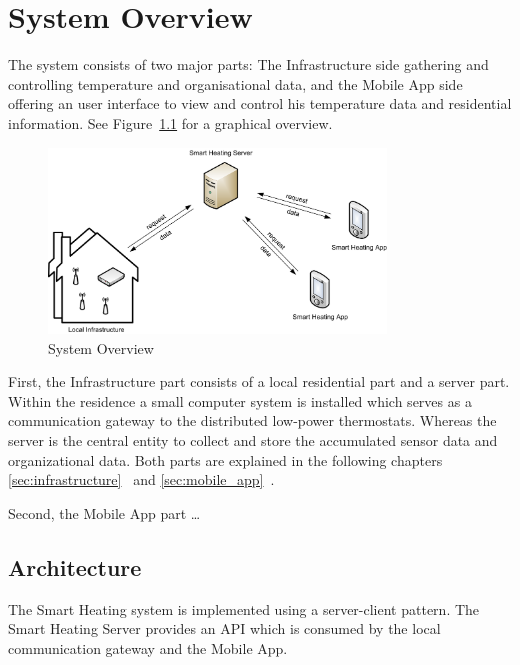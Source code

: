
\chapter{System Overview}
\label{sec:system_overview}

The system consists of two major parts: The Infrastructure side gathering and controlling temperature and organisational data, and the Mobile App side offering an user interface to view and control his temperature data and residential information. See Figure~\ref{fig:systemoverview} for a graphical overview.

\begin{figure}[h]
\begin{center}
\includegraphics[width=0.8\textwidth]{images/SystemOverview.png}
\end{center}
\caption{System Overview}
\label{fig:systemoverview}
\end{figure}

First, the Infrastructure part consists of a local residential part and a server part. Within the residence a small computer system is installed which serves as a communication gateway to the distributed low-power thermostats.
Whereas the server is the central entity to collect and store the accumulated sensor data and organizational data. Both parts are explained in the following chapters \ref{sec:infrastructure}~ and \ref{sec:mobile_app}~.

Second, the Mobile App part \dots{}

\section{Architecture}

The Smart Heating system is implemented using a server-client pattern. The Smart Heating Server provides an API which is consumed by the local communication gateway and the Mobile App.


